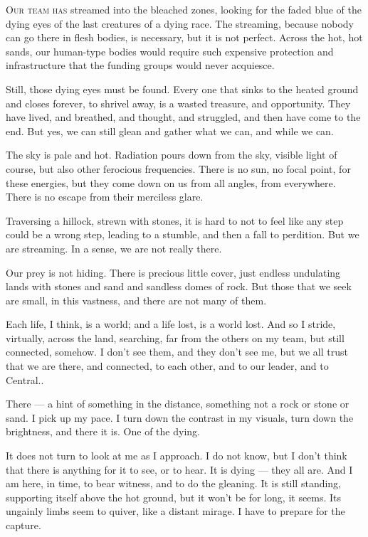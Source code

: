 
\lettrine{O}{ur team has} streamed into the bleached zones, looking for the faded
blue of the dying eyes of the last creatures of a dying race. The
streaming, because nobody can go there in flesh bodies, is necessary,
but it is not perfect. Across the hot, hot sands, our human-type bodies
would require such expensive protection and infrastructure that the
funding groups would never acquiesce.

Still, those dying eyes must be found. Every one that sinks to the
heated ground and closes forever, to shrivel away, is a wasted treasure,
and opportunity. They have lived, and breathed, and thought, and
struggled, and then have come to the end. But yes, we can still glean
and gather what we can, and while we can.

The sky is pale and hot. Radiation pours down from the sky, visible
light of course, but also other ferocious frequencies. There is no sun,
no focal point, for these energies, but they come down on us from all
angles, from everywhere. There is no escape from their merciless glare.

Traversing a hillock, strewn with stones, it is hard to not to feel like
any step could be a wrong step, leading to a stumble, and then a fall to
perdition. But we are streaming. In a sense, we are not really there.

Our prey is not hiding. There is precious little cover, just endless
undulating lands with stones and sand and sandless domes of rock. But
those that we seek are small, in this vastness, and there are not many
of them.

Each life, I think, is a world; and a life lost, is a world lost. And so
I stride, virtually, across the land, searching, far from the others on
my team, but still connected, somehow. I don't see them, and they don't
see me, but we all trust that we are there, and connected, to each
other, and to our leader, and to Central..

There --- a hint of something in the distance, something not a rock or
stone or sand. I pick up my pace. I turn down the contrast in my
visuals, turn down the brightness, and there it is. One of the dying.

It does not turn to look at me as I approach. I do not know, but I don't
think that there is anything for it to see, or to hear. It is dying ---
they all are. And I am here, in time, to bear witness, and to do the
gleaning. It is still standing, supporting itself above the hot ground,
but it won't be for long, it seems. Its ungainly limbs seem to quiver,
like a distant mirage. I have to prepare for the capture.

